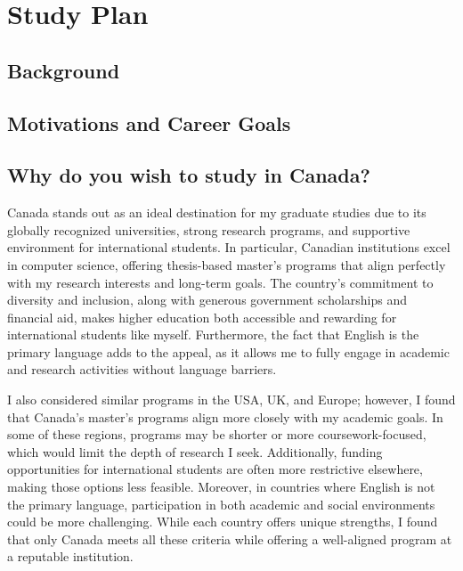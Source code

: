 
\chapter{Study Plan}\label{sec:study-plan}

\section*{Background}

\lipsum[1][1-20]

\section*{Motivations and Career Goals}

\lipsum[1][1-30]

\section*{Why do you wish to study in Canada?}

Canada stands out as an ideal destination for my graduate studies due to its globally recognized universities, strong research programs, and supportive environment for international students. In particular, Canadian institutions excel in computer science, offering thesis-based master's programs that align perfectly with my research interests and long-term goals. The country's commitment to diversity and inclusion, along with generous government scholarships and financial aid, makes higher education both accessible and rewarding for international students like myself. Furthermore, the fact that English is the primary language adds to the appeal, as it allows me to fully engage in academic and research activities without language barriers.

I also considered similar programs in the USA, UK, and Europe; however, I found that Canada's master's programs align more closely with my academic goals. In some of these regions, programs may be shorter or more coursework-focused, which would limit the depth of research I seek. Additionally, funding opportunities for international students are often more restrictive elsewhere, making those options less feasible. Moreover, in countries where English is not the primary language, participation in both academic and social environments could be more challenging. While each country offers unique strengths, I found that only Canada meets all these criteria while offering a well-aligned program at a reputable institution.

